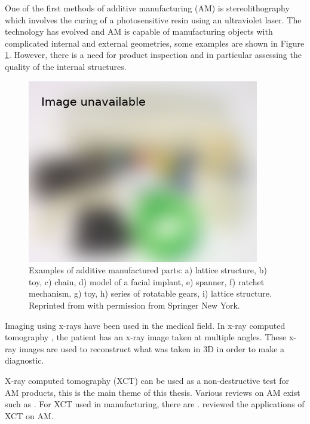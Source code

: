 One of the first methods of additive manufacturing (AM) is stereolithography \citep{kodama1981automatic, hull1986apparatus, 3d2019our} which involves the curing of a photosensitive resin using an ultraviolet laser. The technology has evolved and AM is capable of manufacturing objects with complicated internal and external geometries, some examples are shown in Figure \ref{fig:literature_3dprint}. However, there is a need for product inspection and in particular assessing the quality of the internal structures.

\begin{figure}
  \centering
  \includegraphics[width=0.9\textwidth]{../figures/literatureReview/literature_3dprint.png}
  \caption{Examples of additive manufactured parts: a) lattice structure, b) toy, c) chain, d) model of a facial implant, e) spanner, f) ratchet mechanism, g) toy, h) series of rotatable gears, i) lattice structure. Reprinted from \cite{gibson2010additive} with permission from Springer New York.}
  \label{fig:literature_3dprint}
\end{figure}

Imaging using x-rays \citep{rontgen1896on} have been used in the medical field. In x-ray computed tomography \citep{cormack1973reconstruction, hounsfield1973computerized, hounsfield1980computed}, the patient has an x-ray image taken at multiple angles. These x-ray images are used to reconstruct what was taken in 3D in order to make a diagnostic.

X-ray computed tomography (XCT) can be used as a non-destructive test for AM products, this is the main theme of this thesis. Various reviews on AM exist such as \cite{kruth1991material, kruth1998progress, pham1998comparison, gibson2010additive, wong2012review, ngo2018additive}. For XCT used in manufacturing, there are \cite{cantatore2011introduction, kruth2011computed, sun2012overview}. \cite{thompson2016x} reviewed the applications of XCT on AM.

